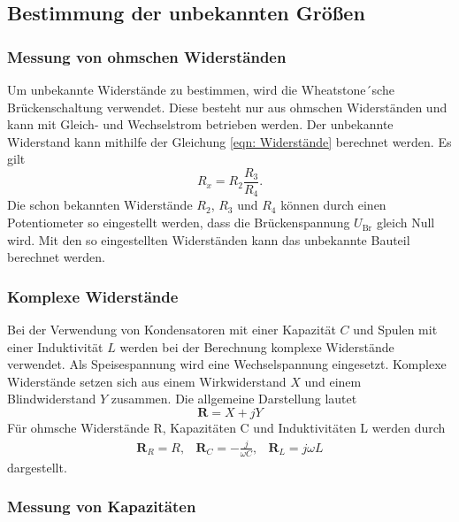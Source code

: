 \subsection{Bestimmung der unbekannten Größen}

    \subsubsection{Messung von ohmschen Widerständen}

        Um unbekannte Widerstände zu bestimmen, wird die Wheatstone´sche Brückenschaltung verwendet.
        Diese besteht nur aus ohmschen Widerständen und kann mit Gleich- und Wechselstrom betrieben werden.
        Der unbekannte Widerstand kann mithilfe der Gleichung \eqref{eqn: Widerstände} berechnet werden.
        Es gilt
        \begin{equation}
            R_x = R_2 \frac{R_3}{R_4} . \label{eqn: Rx}
        \end{equation}
        Die schon bekannten Widerstände $R_2$, $R_3$ und $R_4$ können durch einen Potentiometer so eingestellt werden,
        dass die Brückenspannung $U_\text{Br}$ gleich Null wird.
        Mit den so eingestellten Widerständen kann das unbekannte Bauteil berechnet werden.

    \subsubsection{Komplexe Widerstände}

        Bei der Verwendung von Kondensatoren mit einer Kapazität $C$ und Spulen mit einer Induktivität $L$ werden bei der Berechnung
        komplexe Widerstände verwendet. Als Speisespannung wird eine Wechselspannung eingesetzt.
        Komplexe Widerstände setzen sich aus einem Wirkwiderstand $X$ und einem Blindwiderstand $Y$ zusammen.
        Die allgemeine Darstellung lautet
        \begin{equation}
            \symbf{R} = X + jY
        \end{equation}
        Für ohmsche Widerstände R, Kapazitäten C und Induktivitäten L werden durch
        \begin{align}
            \symbf{R}_R = R, & \symbf{R}_C = - \frac{j}{\omega C}, & \symbf{R}_L = j \omega L %
        \end{align}
        dargestellt.

    \subsubsection{Messung von Kapazitäten}


